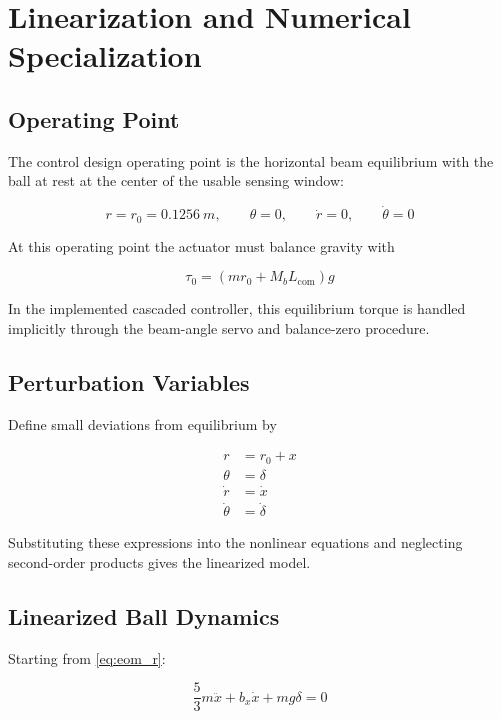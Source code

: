 \chapter{Linearization and Numerical Specialization}

\section{Operating Point}

The control design operating point is the horizontal beam equilibrium with the ball at
rest at the center of the usable sensing window:

\begin{equation}
  r = r_0 = \SI{0.1256}{m}, \qquad
  \theta = 0, \qquad
  \dot{r} = 0, \qquad
  \dot{\theta} = 0
\end{equation}

At this operating point the actuator must balance gravity with

\begin{equation}
  \tau_0 = (mr_0 + M_bL_{\text{com}})g
\end{equation}

In the implemented cascaded controller, this equilibrium torque is handled implicitly
through the beam-angle servo and balance-zero procedure.

\section{Perturbation Variables}

Define small deviations from equilibrium by

\begin{align}
  r &= r_0 + x \\
  \theta &= \delta \\
  \dot{r} &= \dot{x} \\
  \dot{\theta} &= \dot{\delta}
\end{align}

Substituting these expressions into the nonlinear equations and neglecting second-order
products gives the linearized model.

\section{Linearized Ball Dynamics}

Starting from \eqref{eq:eom_r}:

\begin{equation}
  \frac{5}{3}m\ddot{x} + b_x\dot{x} + mg\delta = 0
\end{equation}

